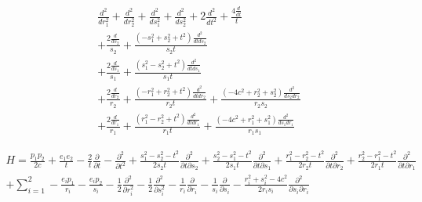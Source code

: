 \documentclass{article}
\begin{document}
\begin{align*}
  \frac{d^{2}}{d r_{1}^{2}}  + \frac{d^{2}}{d r_{2}^{2}}  + \frac{d^{2}}{d s_{1}^{2}}  + \frac{d^{2}}{d s_{2}^{2}} + 2 \frac{d^{2}}{d t^{2}}  + \frac{4 \frac{d}{d t} }{t}\\
  + \frac{2 \frac{d}{d s_{2}} }{s_{2}} + \frac{\left(- s_{1}^{2} + s_{2}^{2} + t^{2}\right) \frac{d^{2}}{d td s_{2}} }{s_{2} t}\\
  + \frac{2 \frac{d}{d s_{1}} }{s_{1}} + \frac{\left(s_{1}^{2} - s_{2}^{2} + t^{2}\right) \frac{d^{2}}{d td s_{1}} }{s_{1} t}\\
  + \frac{2 \frac{d}{d r_{2}} }{r_{2}} + \frac{\left(- r_{1}^{2} + r_{2}^{2} + t^{2}\right) \frac{d^{2}}{d td r_{2}} }{r_{2} t} + \frac{\left(- 4 c^{2} + r_{2}^{2} + s_{2}^{2}\right) \frac{d^{2}}{d s_{2}d r_{2}} }{r_{2} s_{2}}\\
  + \frac{2 \frac{d}{d r_{1}} }{r_{1}} + \frac{\left(r_{1}^{2} - r_{2}^{2} + t^{2}\right) \frac{d^{2}}{d td r_{1}} }{r_{1} t} + \frac{\left(- 4 c^{2} + r_{1}^{2} + s_{1}^{2}\right) \frac{d^{2}}{d s_{1}d r_{1}} }{r_{1} s_{1}}
\end{align*}

\begin{align*}
  H=\frac{p_1p_2}{2c} + \frac{e_1e_2}{t} -\frac{2}{t}\frac{\partial}{\partial t} - \frac{\partial^2}{\partial t^2} + \frac{s_1^2-s_2^2-t^2}{2s_2t}\frac{\partial^2}{\partial t\partial s_2} + \frac{s_2^2-s_1^2-t^2}{2s_1t}\frac{\partial^2}{\partial t\partial s_1}  + \frac{r_1^2-r_2^2-t^2}{2r_2t}\frac{\partial^2}{\partial t\partial r_2} + \frac{r_2^2-r_1^2-t^2}{2r_1t}\frac{\partial^2}{\partial t\partial r_1} \\
  + \sum_{i=1}^2 -\frac{e_ip_1}{r_i} -\frac{e_ip_2}{s_i} - \frac{1}{2}\frac{\partial^2}{\partial r_i^2}- \frac{1}{2}\frac{\partial^2}{\partial s_i^2} - \frac{1}{r_i}\frac{\partial}{\partial r_i} - \frac{1}{s_i}\frac{\partial}{\partial s_i} - \frac{r_i^2+s_i^2-4c^2}{2r_is_i}\frac{\partial^2}{\partial s_i\partial r_i}
\end{align*}
\end{document}
